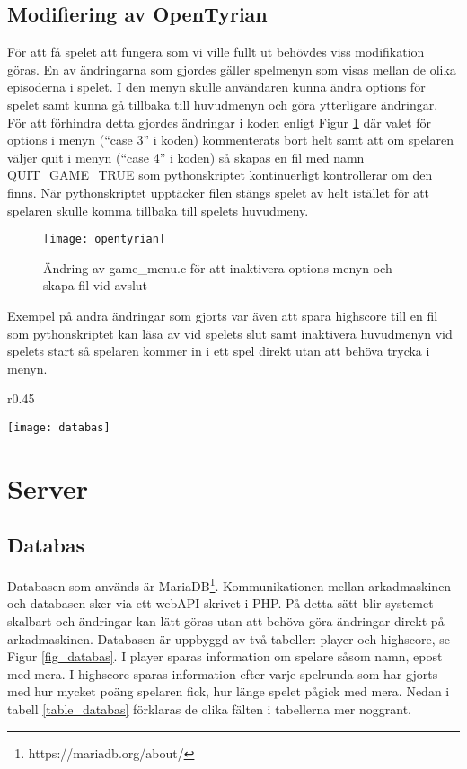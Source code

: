 \documentclass[12pt,fleqn,openany]{book} %
\begin{document}
\subsection{Modifiering av OpenTyrian}
För att få spelet att fungera som vi ville fullt ut behövdes viss modifikation göras. En av ändringarna som gjordes 
gäller spelmenyn som visas mellan de olika episoderna i spelet. I den menyn skulle användaren kunna ändra options för 
spelet samt kunna gå tillbaka till huvudmenyn och göra ytterligare ändringar. 
För att förhindra detta gjordes ändringar i koden enligt Figur \ref{fig_opentyrian} där valet för options i menyn 
(“case 3” i koden) kommenterats bort helt samt att om spelaren väljer quit i menyn (“case 4” i koden) så skapas en 
fil med namn QUIT\_GAME\_TRUE som pythonskriptet kontinuerligt kontrollerar om den finns. När pythonskriptet upptäcker 
filen stängs spelet av helt istället för att spelaren skulle komma tillbaka till spelets huvudmeny.

\begin{figure}[!h]
\texttt{[image: opentyrian]}
\caption{Ändring av game\_menu.c för att inaktivera options-menyn och skapa fil vid avslut}
\label{fig_opentyrian}
\end{figure}
Exempel på andra ändringar som gjorts var även att spara highscore till en fil som pythonskriptet kan läsa av vid 
spelets slut samt inaktivera huvudmenyn vid spelets start så spelaren kommer in i ett spel direkt utan att behöva 
trycka i menyn.

\begin{wrapfigure}{r}{0.45\textwidth}
  \begin{center}
    \texttt{[image: databas]}
  \end{center}
  \caption{Databastabeller}
  \label{fig_databas}
\end{wrapfigure}

\section{Server}
\subsection{Databas}

Databasen som används är MariaDB\footnote{https://mariadb.org/about/}. Kommunikationen mellan arkadmaskinen och databasen 
sker via ett webAPI skrivet i PHP. På detta sätt blir systemet skalbart och ändringar kan lätt göras utan att behöva göra 
ändringar direkt på arkadmaskinen. Databasen är uppbyggd av två tabeller: player och highscore, se Figur \ref{fig_databas}.
\clearpage
I player sparas information om spelare såsom namn, epost med mera. I highscore sparas information efter varje spelrunda som
har gjorts med hur mycket poäng spelaren fick, hur länge spelet pågick med mera. Nedan i tabell \ref{table_databas} förklaras de olika fälten
i tabellerna mer noggrant.
\end{document}
